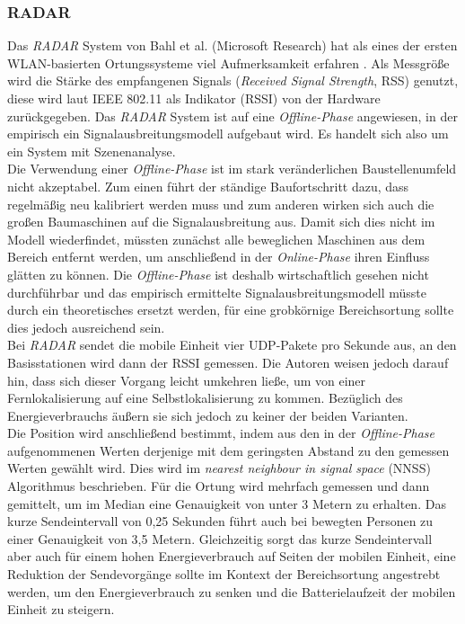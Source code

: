\subsubsection{RADAR}
\label{ch:Vorherige:sec:RADAR}
Das \emph{RADAR} System von Bahl et al. (Microsoft Research) hat als eines der ersten WLAN-basierten Ortungssysteme viel Aufmerksamkeit erfahren \cite{bahl2000radar}.
Als Messgröße wird die Stärke des empfangenen Signals (\emph{Received Signal Strength}, RSS) genutzt, diese wird laut IEEE 802.11 als Indikator (RSSI) von der Hardware zurückgegeben. 
Das \emph{RADAR} System ist auf eine \emph{Offline-Phase} angewiesen, in der empirisch ein Signalausbreitungsmodell aufgebaut wird. 
Es handelt sich also um ein System mit Szenenanalyse.\\
Die Verwendung einer \emph{Offline-Phase} ist im stark veränderlichen Baustellenumfeld nicht akzeptabel. 
Zum einen führt der ständige Baufortschritt dazu, dass regelmäßig neu kalibriert werden muss und zum anderen wirken sich auch die großen Baumaschinen auf die Signalausbreitung aus. 
Damit sich dies nicht im Modell wiederfindet, müssten zunächst alle beweglichen Maschinen aus dem Bereich entfernt werden, um anschließend in der \emph{Online-Phase} ihren Einfluss glätten zu können.
Die \emph{Offline-Phase} ist deshalb wirtschaftlich gesehen nicht durchführbar und das empirisch ermittelte Signalausbreitungsmodell müsste durch ein theoretisches ersetzt werden, für eine grobkörnige Bereichsortung sollte dies jedoch ausreichend sein.\\
Bei \emph{RADAR} sendet die mobile Einheit vier UDP-Pakete pro Sekunde aus, an den Basisstationen wird dann der RSSI gemessen.
Die Autoren weisen jedoch darauf hin, dass sich dieser Vorgang leicht umkehren ließe, um von einer Fernlokalisierung auf eine Selbstlokalisierung zu kommen.
Bezüglich des Energieverbrauchs äußern sie sich jedoch zu keiner der beiden Varianten.\\
Die Position wird anschließend bestimmt, indem aus den in der \emph{Offline-Phase} aufgenommenen Werten derjenige mit dem geringsten Abstand zu den gemessen Werten gewählt wird. 
Dies wird im \emph{nearest neighbour in signal space} (NNSS) Algorithmus beschrieben.
Für die Ortung wird mehrfach gemessen und dann gemittelt, um im Median eine Genauigkeit von unter 3 Metern zu erhalten. 
Das kurze Sendeintervall von 0,25 Sekunden führt auch bei bewegten Personen zu einer Genauigkeit von 3,5 Metern.
Gleichzeitig sorgt das kurze Sendeintervall aber auch für einem hohen Energieverbrauch auf Seiten der mobilen Einheit, eine Reduktion der Sendevorgänge sollte im Kontext der Bereichsortung angestrebt werden, um den Energieverbrauch zu senken und die Batterielaufzeit der mobilen Einheit zu steigern.

